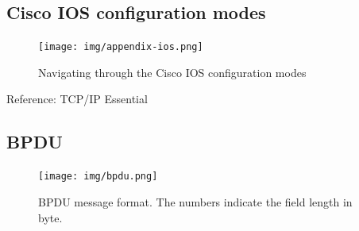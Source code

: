 \documentclass[10pt,a4paper]{article}
\numberwithin{equation}{section}
\numberwithin{figure}{section}
\numberwithin{table}{section}
\begin{document}
\subsection{Cisco IOS configuration modes}
\begin{figure}[H]
    \centering
    \texttt{[image: img/appendix-ios.png]}
    \caption{Navigating through the Cisco IOS configuration modes}
\end{figure}
Reference: TCP/IP Essential
\subsection{BPDU}
\begin{figure}[H]
    \centering
    \texttt{[image: img/bpdu.png]}
    \caption{BPDU message format. The numbers indicate the field length in byte.}
\end{figure}
\end{document}
